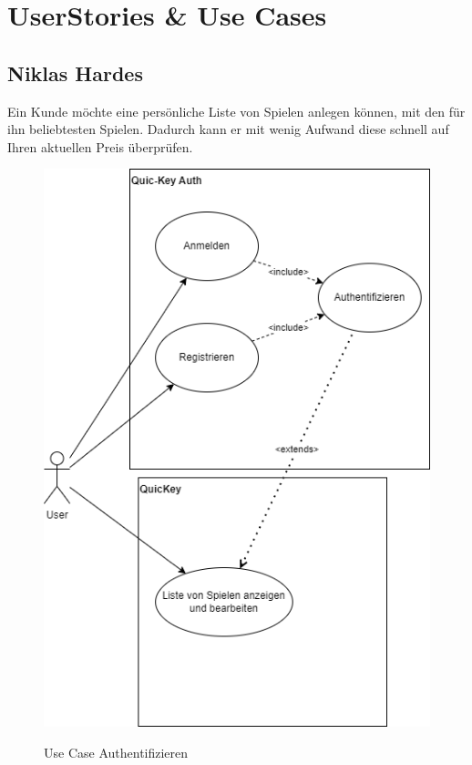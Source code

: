 \section{UserStories \& Use Cases}


\subsection*{Niklas Hardes}

Ein Kunde möchte eine persönliche Liste von Spielen anlegen können, mit den für ihn beliebtesten Spielen. Dadurch kann er mit wenig Aufwand diese schnell auf Ihren aktuellen Preis überprüfen. 

\begin{figure}[hbt]
    \begin{minipage}[t]{.7\textwidth} %
        \caption{Use Case Authentifizieren} %
        \includegraphics[width=1\textwidth]{img/use_case_auth.png}\\ %
    \end{minipage}
\end{figure}

